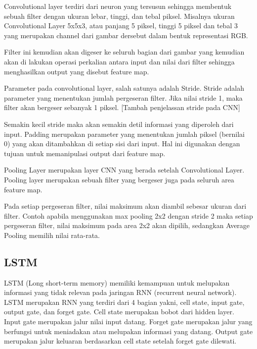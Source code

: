 \documentclass[./skripsi.tex]{subfiles}
\begin{document}
\par Convolutional layer terdiri dari neuron yang tersusun sehingga membentuk sebuah filter dengan ukuran lebar, tinggi, dan tebal piksel.
Misalnya ukuran Convolutional Layer 5x5x3, atau panjang 5 piksel, tinggi 5 piksel dan tebal 3 yang merupakan channel dari gambar dersebut dalam bentuk representasi RGB.

\par Filter ini kemudian akan digeser ke seluruh bagian dari gambar yang kemudian akan di lakukan operasi perkalian antara input dan nilai dari filter sehingga menghasilkan
output yang disebut feature map.

\par Parameter pada convolutional layer, salah satunya adalah Stride. Stride adalah parameter yang menentukan jumlah pergeseran filter.
Jika nilai stride 1, maka filter akan bergeser sebanyak 1 piksel.
[Tambah penjelassan stride pada CNN]

\par Semakin kecil stride maka akan semakin detil informasi yang diperoleh dari input.
Padding merupakan parameter yang menentukan jumlah piksel (bernilai 0) yang akan ditambahkan di setiap sisi dari input. Hal ini digunakan dengan tujuan untuk memanipulasi output dari feature map.
\par Pooling Layer merupakan layer CNN yang berada setelah Convolutional Layer. Pooling layer merupakan sebuah filter yang bergeser juga pada seluruh area feature map.
\par Pada setiap pergeseran filter, nilai maksimum akan diambil sebesar ukuran dari filter. Contoh apabila menggunakan max pooling 2x2 dengan stride 2
maka setiap pergeseran filter, nilai maksimum pada area 2x2 akan dipilih, sedangkan Average Pooling memilih nilai rata-rata.

\subsection{LSTM}
\par LSTM (Long short-term memory) memiliki kemampuan untuk melupakan informasi yang tidak relevan pada jaringan RNN (recurrent neural network). LSTM merupakan RNN yang terdiri dari 4 bagian yakni, cell state, input gate, output gate, dan forget gate. Cell state merupakan bobot dari hidden layer. Input gate merupakan jalur nilai input datang. Forget gate merupakan jalur yang berfungsi untuk meniadakan atau melupakan informasi yang datang. Output gate merupakan jalur keluaran berdasarkan cell state setelah forget gate dilewati.
\end{document}

